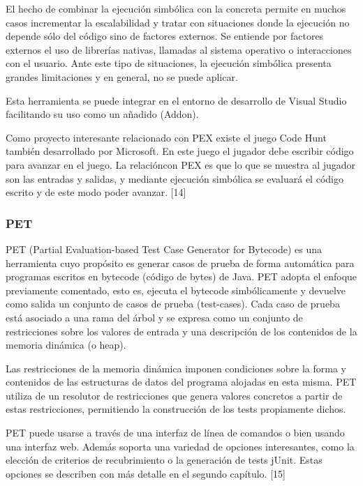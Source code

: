 El hecho de combinar la ejecuci\'on simb\'olica con la concreta permite en muchos casos incrementar la escalabilidad y tratar con situaciones donde la ejecuci\'on no depende s\'olo del c\'odigo sino de factores externos. Se entiende por factores externos el uso de librer\'ias nativas, llamadas al sistema operativo o interacciones con el usuario. Ante este tipo de situaciones, la ejecuci\'on simb\'olica presenta grandes limitaciones y en general, no se puede aplicar.

Esta herramienta se puede integrar en el entorno de desarrollo de Visual Studio facilitando su uso como un a\~nadido (Add\-on).

Como proyecto interesante relacionado con PEX existe el juego Code Hunt tambi\'en desarrollado por Microsoft. En este juego el jugador debe escribir c\'odigo para avanzar en el juego. La relaci\'oncon PEX es que lo que se muestra al jugador son las entradas y salidas, y mediante ejecuci\'on simb\'olica se evaluar\'a el c\'odigo escrito y de este modo poder avanzar. [14]

\subsubsection{PET}

PET (Partial Evaluation-based Test Case Generator for Bytecode) es una herramienta cuyo prop\'osito es generar casos de prueba de forma autom\'atica para programas escritos en bytecode (c\'odigo de bytes) de Java. PET adopta el enfoque previamente comentado, esto es, ejecuta el bytecode simb\'olicamente y devuelve como salida un conjunto de casos de prueba (test-cases). Cada caso de prueba est\'a asociado a una rama del \'arbol y se expresa como un conjunto de restricciones sobre los valores de entrada y una descripci\'on de los contenidos de la memoria din\'amica (o heap).

Las restricciones de la memoria din\'amica imponen condiciones sobre la forma y contenidos de las estructuras de datos del programa alojadas en esta misma. PET utiliza de un resolutor de restricciones que genera valores concretos a partir de estas restricciones, permitiendo la construcci\'on de los
tests propiamente dichos.

PET puede usarse a trav\'es de una interfaz de l\'inea de comandos o bien usando una interfaz web. Adem\'as soporta una variedad de opciones interesantes, como la elecci\'on de criterios de recubrimiento o la generaci\'on de tests jUnit. Estas opciones se describen con m\'as detalle en el segundo cap\'itulo. [15]

